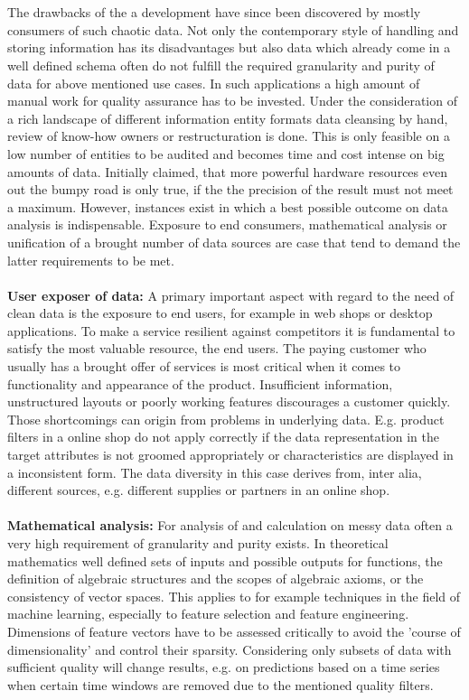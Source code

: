 \\\\
The drawbacks of the a development have since been discovered by mostly consumers of such chaotic data. Not only the contemporary style of handling and storing information has its disadvantages but also data which already come in a well defined schema often do not fulfill the required granularity and purity of data for above mentioned use cases. In such applications a high amount of manual work for quality assurance has to be invested. Under the consideration of a rich landscape of different information entity formats data cleansing by hand, review of know-how owners or restructuration is done. This is only feasible on a low number of entities to be audited and becomes time and cost intense on big amounts of data. Initially claimed, that more powerful hardware resources even out the bumpy road is only true, if the the precision of the result must not meet a maximum. However, instances exist in which a best possible outcome on data analysis is indispensable. Exposure to end consumers, mathematical analysis or unification of a brought number of data sources are case that tend to demand the latter requirements to be met. 
\\\\
\textbf{User exposer of data:} A primary important aspect with regard to the need of clean data is the exposure to end users, for example in web shops or desktop applications. To make a service resilient against competitors it is fundamental to satisfy the most valuable resource, the end users. The paying customer who usually has a brought offer of services is most critical when it comes to functionality and appearance of the product. Insufficient information, unstructured layouts or poorly working features discourages a customer quickly. Those shortcomings can origin from problems in underlying data. E.g. product filters in a online shop do not apply correctly if the data representation in the target attributes is not groomed appropriately or characteristics are displayed in a inconsistent form. The data diversity in this case derives from, inter alia, different sources, e.g. different supplies or partners in an online shop.
\\\\
\textbf{Mathematical analysis:} For analysis of and calculation on messy data often a very high requirement of granularity and purity exists. In theoretical mathematics well defined sets of inputs and possible outputs for functions, the definition of algebraic structures and the scopes of algebraic axioms, or the consistency of vector spaces. This applies to for example techniques in the field of machine learning, especially to feature selection and feature engineering. Dimensions of feature vectors have to be assessed critically to avoid the 'course of dimensionality' and control their sparsity. Considering only subsets of data with sufficient quality will change results, e.g. on predictions based on a time series when certain time windows are removed due to the mentioned quality filters.
